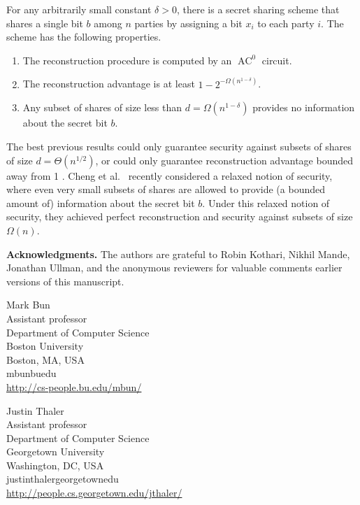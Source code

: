 \documentclass{toc}
\begin{document}
\begin{corollary} \label{cor:secret-sharing}
	For any arbitrarily small constant $\delta > 0$, there is a secret sharing scheme 
	that shares a single bit $b$ among $n$ parties by assigning a bit $x_i$ to each party $i$. The scheme has the following properties.
\begin{enumerate}
\item The reconstruction procedure is computed by an $\operatorname{AC}^0$ circuit.
\item The reconstruction advantage is at least $1-2^{-\Omega(n^{1-\delta})}$.
\item Any subset of shares of size less than $d = \Omega(n^{1-\delta})$ provides no information about the secret bit $b$.
\end{enumerate}
\end{corollary}

The best previous results could only guarantee security against subsets of shares of size $d=\Theta(n^{1/2})$,
or could only guarantee reconstruction advantage bounded away from 1 \cite{viola, adegsurj}. Cheng et al.~\cite{cheng2017near} recently considered
a relaxed notion of security, where even very small subsets of shares are allowed to 
provide (a bounded amount of) information about the secret bit $b$. Under this relaxed notion of security, they achieved perfect reconstruction
and security against subsets of size $\Omega(n)$. 

\medskip \noindent \textbf{Acknowledgments.} The authors are grateful to Robin Kothari, Nikhil Mande, Jonathan Ullman, and the anonymous reviewers
for valuable comments earlier versions of this manuscript. 




%
%
%
%


%
%
%
%
%
\begin{tocauthors}
	\begin{tocinfo}[bun]
		Mark Bun\\
		Assistant professor\\
		Department of Computer Science\\
		Boston University\\
		Boston, MA, USA\\
		mbun\tocat{}bu\tocdot{}edu \\   %
		\url{http://cs-people.bu.edu/mbun/}      %
	\end{tocinfo}
	\begin{tocinfo}[thaler]
		Justin Thaler\\
		Assistant professor\\
		Department of Computer Science\\
		Georgetown University\\
		Washington, DC, USA\\
		justin\tocdot{}thaler\tocat{}georgetown\tocdot{}edu \\
		\url{http://people.cs.georgetown.edu/jthaler/}
	\end{tocinfo}
\end{tocauthors}
\end{document}

